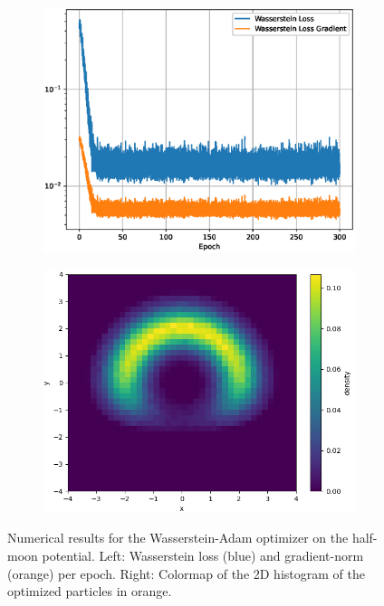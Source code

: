 \documentclass{article}
\begin{document}
\begin{figure}[h]
    \centering
    \begin{subfigure}[b]{0.51\textwidth}
        \centering
        \includegraphics[width=\textwidth]{figures/WassersteinHalfMoonLoss.eps}
    \end{subfigure}%
    \begin{subfigure}[b]{0.51\textwidth}
        \centering
        \includegraphics[width=\textwidth]{figures/WassersteinHalfMoonHistogram.png}
    \end{subfigure}
    \caption{Numerical results for the Wasserstein-Adam optimizer on the half-moon potential. Left: Wasserstein loss (blue) and gradient-norm (orange) per epoch. Right: Colormap of the 2D histogram of the optimized particles in orange.}
    \label{fig:w2_halfmoon}
\end{figure}
\end{document}

